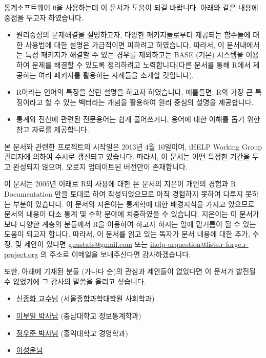 통계소프트웨어 \texttt{R}을 사용하는데 이 문서가 도움이 되길 바랍니다. 
아래와 같은 내용에 중점을 두고자 하였습니다. 

\begin{itemize}
\item 원리중심의 문제해결을 설명하고자, 다양한 패키지들로부터 제공되는 함수들에 대한 사용법에 대한 설명은 가급적이면 피하려고 하였습니다.
따라서, 이 문서내에서는 특정 패키지가 해결할 수 있는 경우를 제외하고는 BASE (기본) 시스템을 이용하여 문제를 해결할 수 있도록 정리하려고 노력합니다(다른 문서를 통해 R에서 제공하는 여러 패키지를 활용하는 사례들을 소개할 것입니다).

\item R이라는 언어의 특징을 살린 설명을 하고자 하였습니다.  
예를들면, R의 가장 큰 특징이라고 할 수 있는 벡터라는 개념을 활용하여 원리 중심의 설명을 제공합니다. 

\item 통계와 전산에 관련된 전문용어는 쉽게 풀어쓰거나, 용어에 대한 이해를 돕기 위한 참고 자료를 제공합니다. 
\end{itemize}

본 문서와 관련한 프로젝트의 시작일은 2013년 4월 10일이며, iHELP Working Group 관리자에 의하여 수시로 갱신되고 있습니다.
따라서, 이 문서는 어떤 특정한 기간을 두고 완성되지 않으며, 오로지 업데이트된 버전만이 존재합니다.

이 문서는 2005년 이래로 R의 사용에 대한 본 문서의 지은이 개인의 경험과 R Documentation 만을 토대로 하여 작성되었으므로 아직 경험하지 못하여 다루지 못하는 부분이 있습니다.
이 문서의 지은이는 통계학에 대한 
배경지식을 가지고 있으므로 문서의 내용이 다소 통계 및 수학 분야에 치중하였을 수 있습니다.
지은이는 이 문서가 보다 다양한 계층의 분들께서 R을 이용하여 하고자 하시는 일에 밑거름이 될 수 있는 도움이 되고자 합니다.
따라서, 이 문서를 읽고 있는 독자가 문서 내용에 대한 추가, 수정, 및 제안이 있다면 \href{mailto:gnustats@gmail.com}{gnustats@gmail.com} 또는 \href{mailto:ihelp-urquestion@lists.r-forge.r-project.org}{ihelp-urquestion@lists.r-forge.r-project.org} 의 주소로 이메일을 보내주신다면 감사하겠습니다. 

또한, 아래에 기재된 분들 (가나다 순)의 관심과 제안들이 없었다면 이 문서가 발전될 수 없었기에 그 감사의 말씀을 올리고 싶습니다. 
\begin{itemize}
\item \href{jhshin@assist.ac.kr}{신종화 교수님} (서울종합과학대학원 사회학과)
\item \href{mailto:buillee@hanmail.net}{이부일 박사님} (충남대학교 정보통계학과)
\item \href{mailto:muoe78@gmail.com}{정우준 박사님} (홍익대학교 경영학과)
\item \href{mailto:christ00@hanmail.net}{이성윤님}
\end{itemize}

